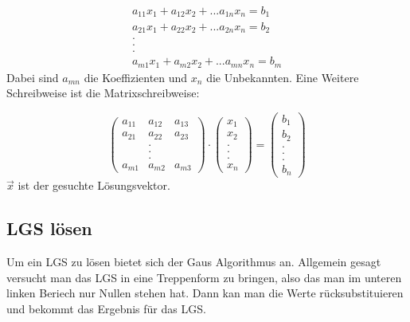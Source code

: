 \documentclass[a4paper,10pt]{scrartcl}
\begin{document}
        \[\begin{array}{c}
            a_{11}x_1 + a_{12}x_2 + ... a_{1n}x_n = b_1 \\
            a_{21}x_1 + a_{22}x_2 + ... a_{2n}x_n = b_2 \\
                        . \\ . \\ . \\
            a_{m1}x_1 + a_{m2}x_2 + ... a_{mn}x_n = b_m
        \end{array}\]
        Dabei sind $a_{mn}$ die Koeffizienten und $x_n$ die Unbekannten. Eine Weitere Schreibweise ist die Matrixschreibweise: 
        
        \[
            \begin{pmatrix}
                a_{11} & a_{12} & a_{13}\\
                a_{21} & a_{22} & a_{23} \\
                 & . &  \\
                 & . & \\
                 & . & \\ 
                a_{m1} & a_{m2} & a_{m3}
                \end{pmatrix}
                \cdot
            \begin{pmatrix}
                x_1 \\
                x_2 \\
                . \\
                .\\
                .\\
                x_n
            \end{pmatrix}
                =
            \begin{pmatrix}
                b_1 \\
                b_2 \\
                . \\
                .\\
                .\\
                b_n
            \end{pmatrix}
        \] 
        $\vec{x}$ ist der gesuchte Lösungsvektor.

        \subsection{LGS lösen}
            Um ein LGS zu lösen bietet sich der Gaus Algorithmus an. Allgemein gesagt versucht man das LGS in eine Treppenform zu bringen, also das man im unteren linken Beriech nur Nullen stehen hat.
            Dann kan man die Werte rücksubstituieren und bekommt das Ergebnis für das LGS.
\end{document}
